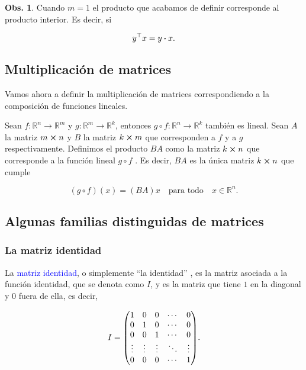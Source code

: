 \documentclass{article}
\theoremstyle{definicion}
\theoremstyle{definition}             %
\theoremstyle{definition}             %
\theoremstyle{definition}
\theoremstyle{definition}
\theoremstyle{observacion}
\newtheorem{obs}{Obs.}
\theoremstyle{definition}
\theoremstyle{plain}
\theoremstyle{definition}
\theoremstyle{afirmacion}
\theoremstyle{notation}
\theoremstyle{definition}
\begin{document}
    \begin{obs}
        Cuando \(m = 1\) el producto que acabamos de definir corresponde al producto interior. Es decir, si 

        \begin{equation*}
            y^{\top} x = y \vdot x.
        \end{equation*}
    \end{obs}

    \subsection{Multiplicación de matrices}

    Vamos ahora a definir la multiplicación de matrices correspondiendo a la composición de funciones lineales.

    Sean \(f \colon \mathbb{R}^{n} \to \mathbb{R}^{m}\) y \(g \colon \mathbb{R}^{m} \to \mathbb{R}^{k}\), entonces \(g \circ f \colon \mathbb{R}^{n} \to \mathbb{R}^{k}\) también es lineal. Sean \(A\) la matriz \(m \cross n\) y \(B\) la matriz \(k \cross m\) que corresponden a \(f\) y a \(g\) respectivamente. Definimos el producto \(BA\) como la matriz \(k \cross n\) que corresponde a la función lineal \(g \circ f\) . Es decir, \(BA\) es la única matriz \(k \cross n\) que cumple

    \begin{equation*}
        (g \circ f)(x) = (BA)x \quad \text{para todo} \quad x \in \mathbb{R}^{n}.
    \end{equation*}

    \subsection{Algunas familias distinguidas de matrices}

    \subsubsection*{La matriz identidad}

    La \textcolor{blue}{matriz identidad}, o simplemente ``la identidad'' , es la matriz asociada a la función identidad, que se denota como \(I\), y es la matriz que tiene \(1\) en la diagonal y \(0\) fuera de ella, es decir,

    \begin{equation*}
        I = \mqty(1 & 0 & 0 & \cdots & 0\\
            0 & 1 & 0 & \cdots & 0\\
            0 & 0 & 1 & \cdots & 0\\
            \vdots & \vdots & \vdots & \ddots & \vdots\\
            0 & 0 & 0 & \cdots & 1).
    \end{equation*}
\end{document}
